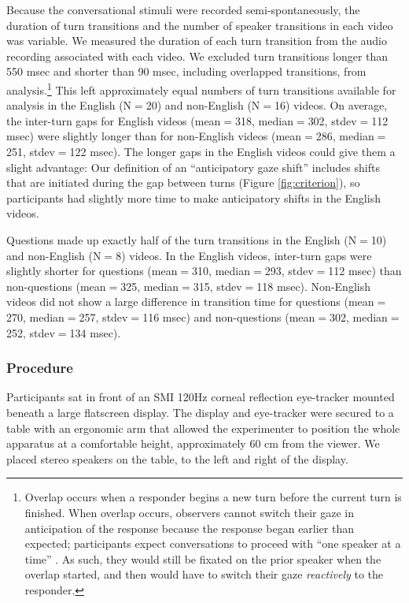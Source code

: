 \documentclass[authoryear, 12pt]{elsarticle}
\begin{document}
Because the conversational stimuli were recorded semi-spontaneously, the duration of turn transitions and the number of speaker transitions in each video was variable. We measured the duration of each turn transition from the audio recording associated with each video. We excluded turn transitions longer than 550 msec and shorter than 90 msec, including overlapped transitions, from analysis.\footnote{Overlap occurs when a responder begins a new turn before the current turn is finished. When overlap occurs, observers cannot switch their gaze in anticipation of the response because the response began earlier than expected; participants expect conversations to proceed with ``one speaker at a time'' \citep{sacks1974}. As such, they would still be fixated on the prior speaker when the overlap started, and then would have to switch their gaze \textit{reactively} to the responder.} This left approximately equal numbers of turn transitions available for analysis in the English (N$=$20) and non-English (N$=$16) videos. On average, the inter-turn gaps for English videos (mean$=$318, median$=$302, stdev$=$112 msec) were slightly longer than for non-English videos (mean$=$286, median$=$251, stdev$=$122 msec). The longer gaps in the English videos could give them a slight advantage: Our definition of an ``anticipatory gaze shift'' includes shifts that are initiated during the gap between turns (Figure \ref{fig:criterion}), so participants had slightly more time to make anticipatory shifts in the English videos.

Questions made up exactly half of the turn transitions in the English (N$=$10) and non-English (N$=$8) videos. In the English videos, inter-turn gaps were slightly shorter for questions (mean$=$310, median$=$293, stdev$=$112 msec) than non-questions (mean$=$325, median$=$315, stdev$=$118 msec). Non-English videos did not show a large difference in transition time for questions (mean$=$270, median$=$257, stdev$=$116 msec) and non-questions (mean$=$302, median$=$252, stdev$=$134 msec).

\subsubsection{Procedure} 
Participants sat in front of an SMI 120Hz corneal reflection eye-tracker mounted beneath a large flatscreen display. The display and eye-tracker were secured to a table with an ergonomic arm that allowed the experimenter to position the whole apparatus at a comfortable height, approximately 60 cm from the viewer. We placed stereo speakers on the table, to the left and right of the display. 
\end{document}
